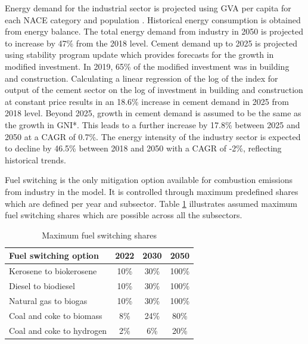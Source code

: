 \documentclass[gmd,manuscript]{copernicus}
\begin{document}
Energy demand for the industrial sector is projected using GVA per capita for each NACE category and population \citep{Yakut2020}. Historical energy consumption is obtained from \citet{SEAI2019} energy balance. The total energy demand from industry in 2050 is projected to increase by 47\% from the 2018 level. Cement demand up to 2025 is projected using \cite{April2020} stability program update which provides forecasts for the growth in modified investment. In 2019, 65\% of the modified investment was in building and construction. Calculating a linear regression of the log of the index for output of the cement sector on the log of investment in building and construction at constant price results in an 18.6\% increase in cement demand in 2025 from 2018 level. Beyond 2025, growth in cement demand is assumed to be the same as the growth in GNI*. This leads to a further increase by 17.8\% between 2025 and 2050 at a CAGR of 0.7\%. The energy intensity of the industry sector is expected to decline by 46.5\% between 2018 and 2050 with a CAGR of -2\%, reflecting historical trends. 

Fuel switching is the only mitigation option available for combustion emissions from industry in the model. It is controlled through maximum predefined shares which are defined per year and subsector. Table \ref{Maximum fuel switching share in Industry} illustrates assumed maximum fuel switching shares which are possible across all the subsectors. 

\begin{table}[htbp]
\footnotesize
 \centering
 \caption{Maximum fuel switching shares}
 \begin{tabular}{lccc}
 \hline
 Fuel switching option & 2022 & 2030 & 2050 \\
 \hline
 Kerosene to biokerosene & 10\% & 30\% & 100\% \\
 Diesel to biodiesel & 10\% & 30\% & 100\% \\
 Natural gas to biogas & 10\% & 30\% & 100\% \\ 
 Coal and coke to biomass & 8\% & 24\% & 80\% \\ 
 Coal and coke to hydrogen & 2\% & 6\% & 20\% \\ \hline
 \end{tabular}%
 \label{Maximum fuel switching share in Industry}%
\end{table}%
\end{document}
